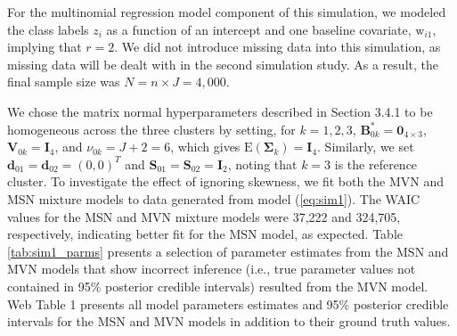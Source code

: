 \documentclass[useAMS,referee]{biom}
\begin{document}
For the multinomial regression model component of this simulation, we modeled the class labels $z_i$ as a function of an intercept and one baseline covariate, $\text{w}_{i1}$, implying that $r = 2$. We did not introduce missing data into this simulation, as missing data will be dealt with in the second simulation study. As a result, the final sample size was $N = n \times J = 4,000$.

We chose the matrix normal hyperparameters described in Section 3.4.1 to be homogeneous across the three clusters by setting, for $k = 1,2,3$, $\mathbf{B}_{0k}^* = \mathbf{0}_{4 \times 3}$, $\mathbf{V}_{0k} = \mathbf{I}_{4}$, and $\nu_{0k} = J + 2 = 6$, which gives $\text{E}(\boldsymbol\Sigma_k) = \mathbf{I}_{4}$. Similarly, we set $\mathbf{d}_{01} = \mathbf{d}_{02} = (0,0)^T$ and $\mathbf{S}_{01} = \mathbf{S}_{02} = \mathbf{I}_{2}$, noting that $k = 3$ is the reference cluster. To investigate the effect of ignoring skewness, we fit both the MVN and MSN mixture models to data generated from model (\ref{eq:sim1}). The WAIC values for the MSN and MVN mixture models were 37,222 and 324,705, respectively, indicating better fit for the MSN model, as expected. Table \ref{tab:sim1_parms} presents a selection of parameter estimates from the MSN and MVN models that show incorrect inference (i.e., true parameter values not contained in 95\% posterior credible intervals) resulted from the MVN model. Web Table 1 presents all model parameters estimates and 95\% posterior credible intervals for the MSN and MVN models in addition to their ground truth values.
\end{document}
